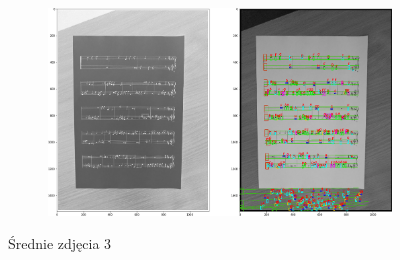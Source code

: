 \documentclass[12pt]{article}
\begin{document}
\begin{enumerate}
\begin{figure}[h!]
\begin{subfigure}[b]{0.48\linewidth}
				\end{subfigure}
				\begin{subfigure}[b]{0.48\linewidth}
					\includegraphics[width=\linewidth]{Medium/Zdj26.png}
				\end{subfigure}
				\label{fig:nuuty2}
				\caption{Średnie zdjęcia 3}
			\end{figure}
			

\end{enumerate}
\end{document}
